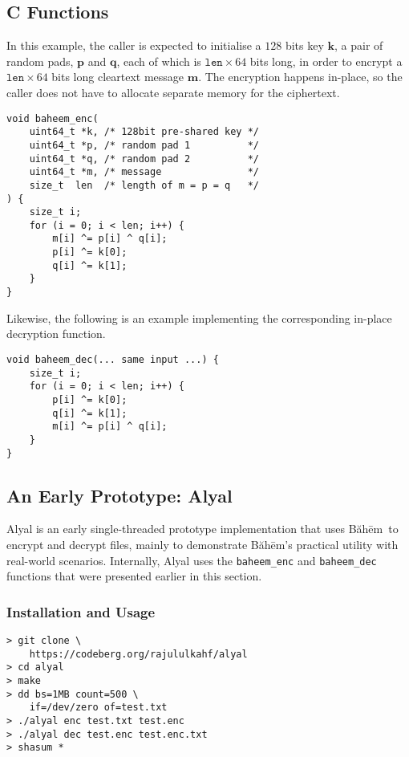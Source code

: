 \documentclass[twocolumn,hidelinks]{article}
\newcommand{\baheem}{Băhēm}
\begin{document}
\subsection{C Functions}
In this example, the caller is expected to initialise a $128$ bits key
$\mathbf{k}$, a pair of random pads, $\mathbf{p}$ and $\mathbf{q}$, each of
which is $\mathtt{len} \times 64$ bits long, in order to encrypt a
$\mathtt{len} \times 64$ bits long cleartext message $\mathbf{m}$.  The
encryption happens in-place, so the caller does not have to allocate
separate memory for the ciphertext.

\begin{verbatim}
void baheem_enc(
    uint64_t *k, /* 128bit pre-shared key */
    uint64_t *p, /* random pad 1          */
    uint64_t *q, /* random pad 2          */
    uint64_t *m, /* message               */
    size_t  len  /* length of m = p = q   */
) {
    size_t i;
    for (i = 0; i < len; i++) {
        m[i] ^= p[i] ^ q[i];
        p[i] ^= k[0];
        q[i] ^= k[1];
    }
}
\end{verbatim}

Likewise, the following is an example implementing the corresponding
in-place decryption function.

\begin{verbatim}
void baheem_dec(... same input ...) {
    size_t i;
    for (i = 0; i < len; i++) {
        p[i] ^= k[0];
        q[i] ^= k[1];
        m[i] ^= p[i] ^ q[i];
    }
}
\end{verbatim}

\subsection{An Early Prototype:  Alyal}
Alyal is an early single-threaded prototype implementation that uses
\baheem\ to encrypt and decrypt files, mainly to demonstrate \baheem's
practical utility with real-world scenarios.  Internally, Alyal uses the
\texttt{baheem\_enc} and \texttt{baheem\_dec} functions that were presented
earlier in this section.

\subsubsection{Installation and Usage}
\begin{verbatim}
> git clone \
    https://codeberg.org/rajululkahf/alyal
> cd alyal
> make
> dd bs=1MB count=500 \
    if=/dev/zero of=test.txt
> ./alyal enc test.txt test.enc
> ./alyal dec test.enc test.enc.txt
> shasum *
\end{verbatim}
\end{document}
